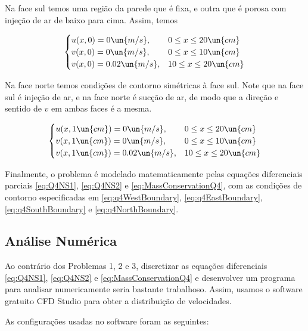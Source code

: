 Na face sul temos uma região da parede que é fixa, e outra que é porosa com injeção
de ar de baixo para cima. Assim, temos

\begin{equation}\label{eq:q4SouthBoundary}
    \begin{cases}
        u(x, 0) = 0 \un{m/s}, & 0 \leq x \leq 20 \un{cm}  \\
        v(x, 0) = 0 \un{m/s}, & 0 \leq x \leq 10 \un{cm}  \\
        v(x, 0) = 0.02 \un{m/s}, & 10 \leq x \leq 20 \un{cm}  \\
    \end{cases}
\end{equation}

Na face norte temos condições de contorno simétricas à face sul. Note que na face
sul é injeção de ar, e na face norte é sucção de ar, de modo que a direção e sentido
de $v$ em ambas faces é a mesma.

\begin{equation}\label{eq:q4NorthBoundary}
    \begin{cases}
        u(x, 1 \un{cm}) = 0 \un{m/s}, & 0 \leq x \leq 20 \un{cm}  \\
        v(x, 1 \un{cm}) = 0 \un{m/s}, & 0 \leq x \leq 10 \un{cm}  \\
        v(x, 1 \un{cm}) = 0.02 \un{m/s}, & 10 \leq x \leq 20 \un{cm}  \\
    \end{cases}
\end{equation}

Finalmente, o problema é modelado matematicamente pelas equações diferenciais parciais
\eqref{eq:Q4NS1}, \eqref{eq:Q4NS2} e \eqref{eq:MassConservationQ4}, com as condições de 
contorno especificadas em \eqref{eq:q4WestBoundary}, \eqref{eq:q4EastBoundary}, 
\eqref{eq:q4SouthBoundary} e \eqref{eq:q4NorthBoundary}.

\subsection{Análise Numérica}

Ao contrário dos Problemas 1, 2 e 3, discretizar as equações diferenciais \eqref{eq:Q4NS1}, \eqref{eq:Q4NS2} e \eqref{eq:MassConservationQ4}
e desenvolver um programa para analisar numericamente seria bastante trabalhoso. Assim, 
usamos o software gratuito CFD Studio para obter a distribuição de velocidades. 

As configurações usadas no software foram as seguintes:

